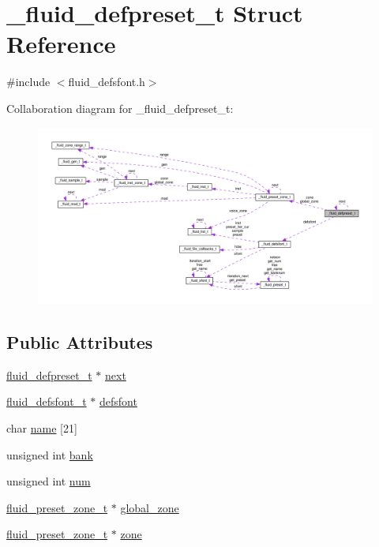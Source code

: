 \hypertarget{struct__fluid__defpreset__t}{}\section{\+\_\+fluid\+\_\+defpreset\+\_\+t Struct Reference}
\label{struct__fluid__defpreset__t}


{\ttfamily \#include $<$fluid\+\_\+defsfont.\+h$>$}



Collaboration diagram for \+\_\+fluid\+\_\+defpreset\+\_\+t\+:
\nopagebreak
\begin{figure}[H]
\begin{center}
\leavevmode
\includegraphics[width=350pt]{struct__fluid__defpreset__t__coll__graph}
\end{center}
\end{figure}
\subsection*{Public Attributes}
\begin{DoxyCompactItemize}
\item 
\hyperlink{fluid__defsfont_8h_a2c2cb41581f95588f665a8f8fe593e18}{fluid\+\_\+defpreset\+\_\+t} $\ast$ \hyperlink{struct__fluid__defpreset__t_a3e0dabe06dd2004596b5b130075b197d}{next}
\item 
\hyperlink{fluid__defsfont_8h_a13799d8f15556117d126e63abd4f40d3}{fluid\+\_\+defsfont\+\_\+t} $\ast$ \hyperlink{struct__fluid__defpreset__t_a2de7477576ee89b8c1dd89762d4f6e0e}{defsfont}
\item 
char \hyperlink{struct__fluid__defpreset__t_a3d29b2417eac798a611e514f780e0808}{name} \mbox{[}21\mbox{]}
\item 
unsigned int \hyperlink{struct__fluid__defpreset__t_aa3933c1b4478be9784304058ab340fe7}{bank}
\item 
unsigned int \hyperlink{struct__fluid__defpreset__t_a401ae39156d3d4c41a5a76a754495abf}{num}
\item 
\hyperlink{fluid__defsfont_8h_a74cb7075332911049d39e60df50019b2}{fluid\+\_\+preset\+\_\+zone\+\_\+t} $\ast$ \hyperlink{struct__fluid__defpreset__t_a8436bd7f9e2fbab916287d8d1522d192}{global\+\_\+zone}
\item 
\hyperlink{fluid__defsfont_8h_a74cb7075332911049d39e60df50019b2}{fluid\+\_\+preset\+\_\+zone\+\_\+t} $\ast$ \hyperlink{struct__fluid__defpreset__t_a470612eff6fe4a286e48a013b17cafdd}{zone}
\end{DoxyCompactItemize}


